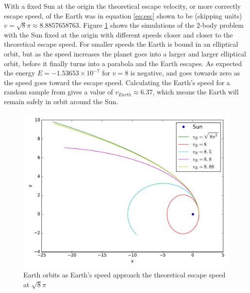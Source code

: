 \documentclass{article}
\begin{document}
With a fixed Sun at the origin the theoretical escape velocity, or more correctly escape speed, of the Earth was in equation \ref{eq:esc} shown to be (skipping units) $v=\sqrt{8}\pi\approx8.8857658763$. Figure \ref{fig:esc} shows the simulations of the 2-body problem with the Sun fixed at the origin with different speeds closer and closer to the theoretical escape speed. For smaller speeds the Earth is bound in an elliptical orbit, but as the speed increases the planet goes into a larger and larger elliptical orbit, before it finally turns into a parabola and the Earth escapes. As expected the energy $E=-1.53653\times 10^{-7}$ for $v=8$ is negative, and goes towards zero as the speed goes toward the escape speed. Calculating the Earth's speed for a random sample from \cite{eph} gives a value of $v_{Earth}\approx6.37$, which means the Earth will remain safely in orbit around the Sun.

\begin{figure}
\centering
\includegraphics[width=0.8\linewidth]{fig/Two_Bodies_Escape_2D.pdf}
\caption{Earth orbits as Earth's speed approach the theoretical escape speed at $\sqrt{8}\pi$}
\label{fig:esc}
\end{figure}

\FloatBarrier
\end{document}
